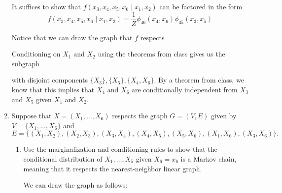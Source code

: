 \documentclass[11pt]{report}
\begin{document}
\begin{enumerate}[1.]
	      \color{blue}
	      It suffices to show that $f(x_3, x_4, x_5, x_6 \; | \; x_1, x_2)$ can be factored in the form
	      \[f(x_3, x_4, x_5, x_6 \; | \; x_1, x_2) = \frac{1}{Z} \phi_{46}(x_{4}, x_6) \phi_{35}(x_{3}, x_5) \]

	      Notice that we can draw the graph that $f$ respects

	      \begin{center}
	      \end{center}

	      Conditioning on $X_1$ and $X_2$ using the theorems from class gives us the subgraph

	      \begin{center}
	      \end{center}

	      with disjoint components $\{X_3\}, \{X_5\}, \{X_4, X_6\}$. By a theorem from class, we know that this implies that $X_4$ and $X_6$ are conditionally independent from $X_3$ and $X_5$ given $X_1$ and $X_2$.
	      \color{black}
	      \pagebreak



	\item Suppose that $X=(X_1,\dotsc,X_6)$ respects the graph $G=(V,E)$ given by $V=\{X_1,\dotsc,X_6\}$ and
	      \[E=\{(X_1,X_2),(X_2,X_3),(X_3,X_4),(X_4,X_5),(X_5,X_6),(X_1,X_6),(X_3,X_6)\}.\]
	      \begin{enumerate}
		      \item Use the marginalization and conditioning rules to show
		            that the conditional distribution of $X_1,\dotsc,X_5$ given $X_6=x_6$ is a Markov chain, meaning that it respects the nearest-neighbor linear graph.

		            \color{blue}
		            We can draw the graph as follows:


\end{enumerate}
\end{enumerate}
\end{document}
